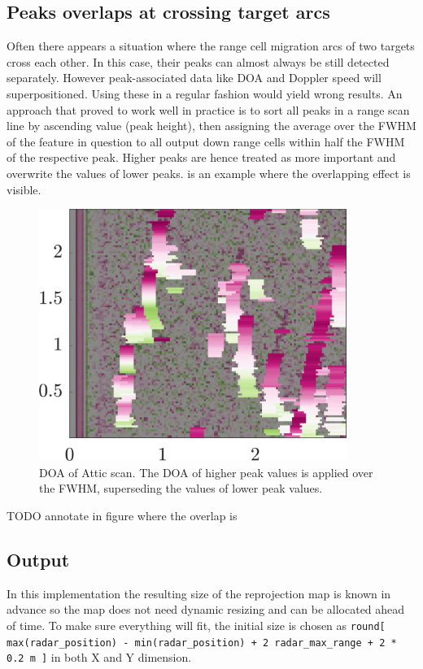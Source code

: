 \subsection{Peaks overlaps at crossing target arcs} \label{peaks-overlaps-at-crossing-target-arcs}
Often there appears a situation where the range cell migration arcs of two targets cross each other. In this case, their peaks can almost always be still detected separately. However peak-associated data like DOA and Doppler speed will superpositioned. Using these in a regular fashion would yield wrong results. An approach that proved to work well in practice is to sort all peaks in a range scan line by ascending value (peak height), then assigning the average over the FWHM of the feature in question to all output down range cells within half the FWHM of the respective peak. Higher peaks are hence treated as more important and overwrite the values of lower peaks.  is an example where the overlapping effect is visible.

\begin{figure}[htbp]
    \centering
    \includegraphics[max width=10cm]{gfx/results/attic_doa.png}
    \caption{DOA of Attic scan. The DOA of higher peak values is applied over the FWHM, superseding the values of lower peak values.}
    \label{fig:overlap}
\end{figure}
TODO annotate in figure where the overlap is

\subsection{Output}\label{output}
In this implementation the resulting size of the reprojection map is known in advance so the map does not need dynamic resizing and can be allocated ahead of time. To make sure everything will fit, the initial size is chosen as \texttt{round[ max(radar\_position) - min(radar\_position) + 2~radar\_max\_range + 2 * 0.2 m ]} in both X and Y dimension.


